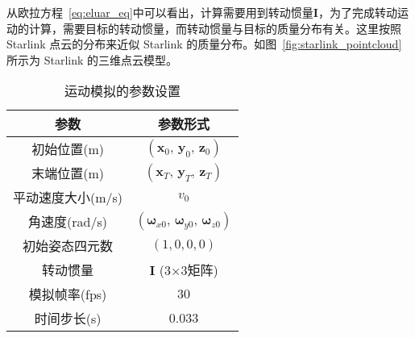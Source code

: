 从欧拉方程~\ref{eq:eluar_eq}中可以看出，计算需要用到转动惯量$\mathbf{I}$，为了完成转动运动的计算，需要目标的转动惯量，而转动惯量与目标的质量分布有关。这里按照 Starlink 点云的分布来近似 Starlink 的质量分布。如图~\ref{fig:starlink_pointcloud}所示为 Starlink 的三维点云模型。

\begingroup
\setlength{\floatsep}{4pt}      %
\setlength{\textfloatsep}{4pt}  %

\begin{table}[!htbp]
	\centering
	\caption{运动模拟的参数设置}
	\label{tab:simulation_parameters}
	\begin{tabular}{cc}
		\toprule[1.5pt]
		参数 & 参数形式 \\
		\midrule[1pt]
		初始位置(m) & $(\mathbf{x}_0,\,\mathbf{y}_0,\,\mathbf{z}_0)$ \\
		末端位置(m) & $(\mathbf{x}_T,\,\mathbf{y}_T,\,\mathbf{z}_T)$ \\
		平动速度大小(m/s) & $v_0$ \\
		角速度(rad/s) & $(\boldsymbol{\omega}_{x0},\,\boldsymbol{\omega}_{y0},\,\boldsymbol{\omega}_{z0})$ \\
		初始姿态四元数 & $(1, 0, 0, 0)$ \\
		转动惯量 & $\mathbf{I}$ (3×3矩阵)\\
		模拟帧率(fps) & $30$ \\
		时间步长(s) & $0.033$ \\
		\bottomrule[1.5pt]
	\end{tabular}
\end{table}

\vspace{-5pt}

